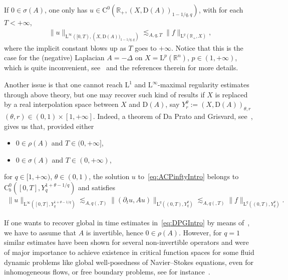 \documentclass[10pt]{amsart}
\theoremstyle{definition}\newtheorem{defi}[theo]{Definition}\newtheorem{rema}[theo]{Remark}\newtheorem{exam}[theo]{Example}\newtheorem{exem}[theo]{Example}\newtheorem{nota}[theo]{Notation}
\newcommand{\bbR}{\mathbb{R}}
\newcommand{\rmD}{\mathrm{D}}
\newcommand{\rmL}{\mathrm{L}}
\newcommand{\rmC}{\mathrm{C}}
\begin{document}
If $0\in\sigma(A)$, one only has $u\in \rmC^0(\bbR_+,(X,\rmD(A))_{1-1/q,q})$, with for each $T<+\infty$,
\begin{align}\label{eq:traceEstnoninvertible}
\| u \|_{\rmL^{\infty}([0,T),\left(X,\rmD(A))_{1-1/q,q}\right)} \lesssim_{A,q,T} \| f\|_{\rmL^q(\bbR_+,X)},
\end{align}
where the implicit constant blows up as $T$ goes to $+\infty$. Notice that this is the case for the (negative) Laplacian $A=-\Delta$ on $X=\rmL^p(\bbR^n)$, $p\in(1,+\infty)$, which is quite inconvenient, see~\cite[Section~1]{Gaudin2023} and the references therein for more details.

Another issue is that one cannot reach $\rmL^1$ and $\rmL^\infty$-maximal regularity estimates through above theory, but one may recover such kind of results if $X$ is replaced by a real interpolation space between $X$ and $\rmD(A)$, say $Y_{r}^{\theta}:=(X,\rmD(A))_{\theta,r}$ $(\theta,r)\in(0,1)\times[1,+\infty]$. Indeed, a theorem of Da Prato and Grisvard, see~\cite[Theorem~4.15]{DaPratoGrisvard1975}, gives us that, provided either
\begin{itemize}
\item $0\in\rho(A)$ and $T\in(0,+\infty]$,
\item $0\in\sigma(A)$ and $T\in(0,+\infty)$,
\end{itemize}
for $q\in[1,+\infty)$, $\theta\in(0,1)$, the solution $u$ to~\eqref{eq:ACPinftyIntro} belongs to $\rmC ^{0}_b([0,T],Y_{q}^{1+\theta-1/q})$ and satisfies
\begin{align}\label{eq:DPGIntro}
\| u\|_{\rmL^\infty\left([0,T],Y_{q}^{1+\theta-1/q}\right)} \lesssim_{A,q(,T)} \| (\partial_t u, Au)\|_{\rmL^q\left((0,T),Y_{q}^{\theta}\right)} \lesssim_{A,q(,T)} \| f\|_{\rmL^q\left((0,T),Y_{q}^{\theta}\right)}.
\end{align}

If one wants to recover global in time estimates in~\eqref{eq:DPGIntro} by means of~\cite[Theorem~4.15]{DaPratoGrisvard1975}, we have to assume that $A$ is invertible, hence $0\in\rho(A)$. However, for $q=1$ similar estimates have been shown for several non-invertible operators and were of major importance to achieve existence in critical function spaces for some fluid dynamic problems like global well-posedness of Navier--Stokes equations, even for inhomogeneous flows, or free boundary problems, see for instance~\cite{Chemin1999,DanchinMucha2009,DanchinMucha2015,OgawaShimizu2016,OgawaShimizu2021,OgawaShimizu2022}.
\end{document}
